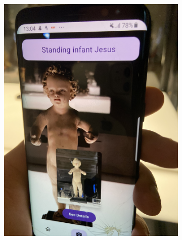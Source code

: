 \begin{figure}[h]
    \begin{subfigure}[b]{0.4\textwidth}
        \centering
        \includegraphics[angle=270, width=\textwidth]{img/test-example-3.jpg}
    \end{subfigure}
    \hfill
    \begin{subfigure}[b]{0.4\textwidth}
        \centering

\end{subfigure}
\end{figure}
